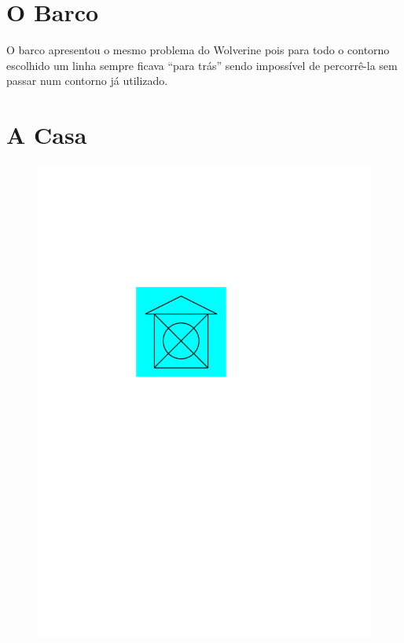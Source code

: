 \documentclass[12pt, a4paper]{article}
\begin{document}
	\section{O Barco}
	
	O barco apresentou o mesmo problema do Wolverine pois para todo o contorno escolhido um linha sempre ficava ``para trás'' sendo impossível de percorrê-la sem passar num contorno já utilizado.
	\newpage
	\section{A Casa}
	\vspace{-.5cm}
	\begin{figure}[H]
		\centering
		\includegraphics[width=0.3\linewidth]{house/house}
		\label{fig:house}
	\end{figure}
\end{document}
